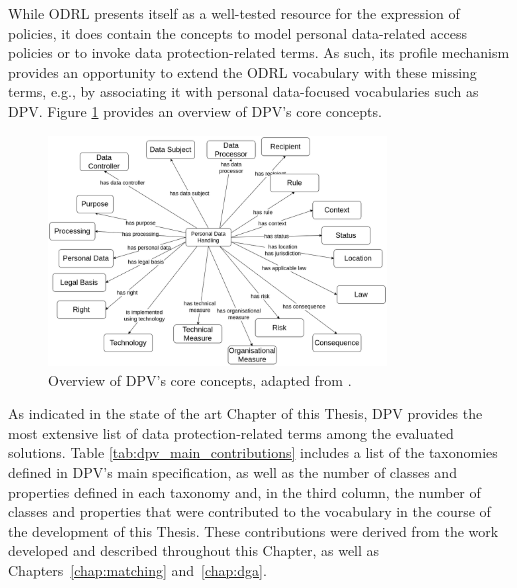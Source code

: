 While ODRL presents itself as a well-tested resource for the expression of policies, it does contain the concepts to model personal data-related access policies or to invoke data protection-related terms.
As such, its profile mechanism provides an opportunity to extend the ODRL vocabulary with these missing terms, e.g., by associating it with personal data-focused vocabularies such as DPV.
Figure \ref{fig:dpv_base} provides an overview of DPV's core concepts.

\begin{figure}[htbp]
\caption{Overview of DPV's core concepts, adapted from \cite{pandit_primer_2022}.}
\label{fig:dpv_base}
\centering
\includegraphics[width=0.8\textwidth]{figures/chapter-4/dpv-base.png}
\end{figure}

As indicated in the state of the art Chapter of this Thesis, DPV provides the most extensive list of data protection-related terms among the evaluated solutions.
Table \ref{tab:dpv_main_contributions} includes a list of the taxonomies defined in DPV's main specification, as well as the number of classes and properties defined in each taxonomy and, in the third column, the number of classes and properties that were contributed to the vocabulary in the course of the development of this Thesis.
These contributions were derived from the work developed and described throughout this Chapter, as well as Chapters~\ref{chap:matching} and~\ref{chap:dga}.

